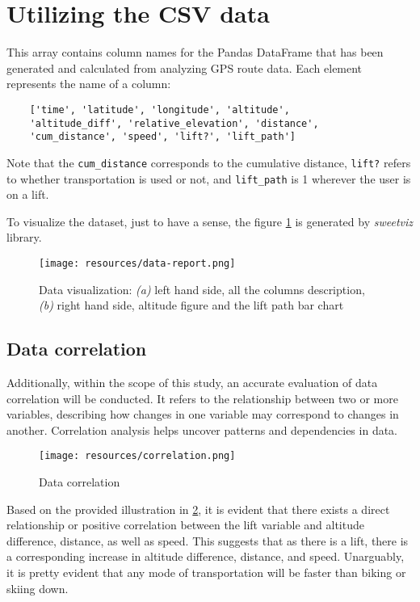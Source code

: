 \section{Utilizing the CSV data}
\label{sec:data-csv}

This array contains column names for the Pandas DataFrame that has been generated and calculated from analyzing GPS route data. Each element represents the name of a column:

\begin{verbatim}
    ['time', 'latitude', 'longitude', 'altitude',
    'altitude_diff', 'relative_elevation', 'distance',
    'cum_distance', 'speed', 'lift?', 'lift_path']
\end{verbatim}

Note that the \texttt{cum\_distance} corresponds to the cumulative distance, 
\texttt{lift?} refers to whether transportation is used or not, and 
\texttt{lift\_path} is 1 wherever the user is on a lift.

To visualize the dataset, just to have a sense, the figure \ref{fig:data-report} is generated by \textit{sweetviz} library. 


\begin{figure}[htb]
	\texttt{[image: resources/data-report.png]}
	\caption{Data visualization: \textit{(a)} left hand side, all the columns description, \textit{(b)} right hand side, altitude figure and the lift path bar chart}
	\label{fig:data-report}
\end{figure}

\subsection{Data correlation}
Additionally, within the scope of this study, an accurate evaluation of data correlation will be conducted. It refers to the relationship between two or more variables, describing how changes in one variable may correspond to changes in another. Correlation analysis helps uncover patterns and dependencies in data.



\begin{figure}[htb]
	\texttt{[image: resources/correlation.png]}
	\caption{Data correlation}
	\label{fig:correlation}
\end{figure}

Based on the provided illustration in  \ref{fig:correlation}, it is evident that there exists a direct relationship or positive correlation between the lift variable and altitude difference, distance, as well as speed. This suggests that as there is a lift, there is a corresponding increase in altitude difference, distance, and speed. Unarguably, it is pretty evident that any mode of transportation will be faster than biking or skiing down.

